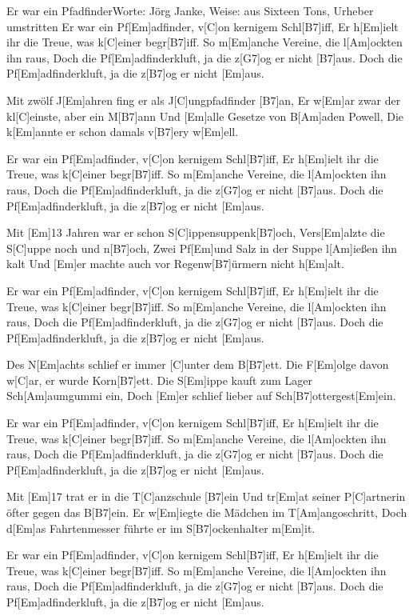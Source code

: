 \documentclass[../main.tex]{subfiles}
\begin{document}
\begin{song}{Er war ein Pfadfinder}{Worte: Jörg Janke, Weise: aus \glqq{}Sixteen Tons\grqq{}, Urheber umstritten}{}
Er war ein Pf[Em]adfinder, v[C]on kernigem Schl[B7]iff,
Er h[Em]ielt ihr die Treue, was k[C]einer begr[B7]iff.
So m[Em]anche Vereine, die l[Am]ockten ihn raus,
Doch die Pf[Em]adfinderkluft, ja die z[G7]og er nicht [B7]aus.
Doch die Pf[Em]adfinderkluft, ja die z[B7]og er nicht [Em]aus.

Mit zwölf J[Em]ahren fing er als J[C]ungpfadfinder [B7]an,
Er w[Em]ar zwar der kl[C]einste, aber ein M[B7]ann
Und [Em]alle Gesetze von B[Am]aden Powell,
Die k[Em]annte er schon damals v[B7]ery w[Em]ell.

Er war ein Pf[Em]adfinder, v[C]on kernigem Schl[B7]iff,
Er h[Em]ielt ihr die Treue, was k[C]einer begr[B7]iff.
So m[Em]anche Vereine, die l[Am]ockten ihn raus,
Doch die Pf[Em]adfinderkluft, ja die z[G7]og er nicht [B7]aus.
Doch die Pf[Em]adfinderkluft, ja die z[B7]og er nicht [Em]aus.

Mit [Em]13 Jahren war er schon S[C]ippensuppenk[B7]och,
Vers[Em]alzte die S[C]uppe noch und n[B7]och,
Zwei Pf[Em]und Salz in der Suppe l[Am]ießen ihn kalt
Und [Em]er machte auch vor Regenw[B7]{ü}rmern nicht h[Em]alt.

Er war ein Pf[Em]adfinder, v[C]on kernigem Schl[B7]iff,
Er h[Em]ielt ihr die Treue, was k[C]einer begr[B7]iff.
So m[Em]anche Vereine, die l[Am]ockten ihn raus,
Doch die Pf[Em]adfinderkluft, ja die z[G7]og er nicht [B7]aus.
Doch die Pf[Em]adfinderkluft, ja die z[B7]og er nicht [Em]aus.

Des N[Em]achts schlief er immer [C]unter dem B[B7]ett.
Die F[Em]olge davon w[C]ar, er wurde Korn[B7]ett.
Die S[Em]ippe kauft zum Lager Sch[Am]aumgummi ein,
Doch [Em]er schlief lieber auf Sch[B7]ottergest[Em]ein.

Er war ein Pf[Em]adfinder, v[C]on kernigem Schl[B7]iff,
Er h[Em]ielt ihr die Treue, was k[C]einer begr[B7]iff.
So m[Em]anche Vereine, die l[Am]ockten ihn raus,
Doch die Pf[Em]adfinderkluft, ja die z[G7]og er nicht [B7]aus.
Doch die Pf[Em]adfinderkluft, ja die z[B7]og er nicht [Em]aus.\pagebreak

Mit [Em]17 trat er in die T[C]anzschule [B7]ein
Und tr[Em]at seiner P[C]artnerin öfter gegen das B[B7]ein.
Er w[Em]iegte die Mädchen im T[Am]angoschritt,
Doch d[Em]as Fahrtenmesser führte er im S[B7]ockenhalter m[Em]it.

Er war ein Pf[Em]adfinder, v[C]on kernigem Schl[B7]iff,
Er h[Em]ielt ihr die Treue, was k[C]einer begr[B7]iff.
So m[Em]anche Vereine, die l[Am]ockten ihn raus,
Doch die Pf[Em]adfinderkluft, ja die z[G7]og er nicht [B7]aus.
Doch die Pf[Em]adfinderkluft, ja die z[B7]og er nicht [Em]aus.


\end{song}
\end{document}
